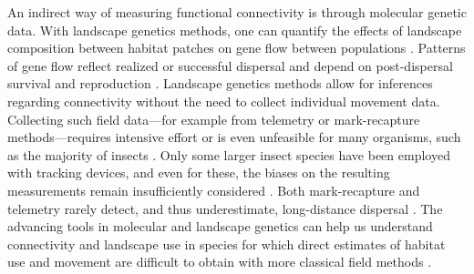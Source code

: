 \documentclass[10pt, twoside]{book} %
\begin{document}
	An indirect way of measuring functional connectivity is through molecular genetic data. With landscape genetics methods, one can quantify the effects of landscape composition between habitat patches on gene flow between populations \citep{manel2003, manel2013, balkenhol2015}. Patterns of gene flow reflect realized or successful dispersal and depend on post-dispersal survival and reproduction \citep{spear2010}. Landscape genetics methods allow for inferences regarding connectivity without the need to collect individual movement data. Collecting such field data---for example from telemetry or mark-recapture methods---requires intensive effort or is even unfeasible for many organisms, such as the majority of insects \citep[chapter \ref{chapter1}]{spear2010, batsleer2020}. Only some larger insect species have been employed with tracking devices, and even for these, the biases on the resulting measurements remain insufficiently considered \citep[chapter \ref{chapter1}]{batsleer2020}. Both mark-recapture and telemetry rarely detect, and thus underestimate, long-distance dispersal \citep{ugelvig2012, trense2021, dero2021}. The advancing tools in molecular and landscape genetics can help us understand connectivity and landscape use in species for which direct estimates of habitat use and movement are difficult to obtain with more classical field methods \citep{spear2010}.\\
	
\end{document}
